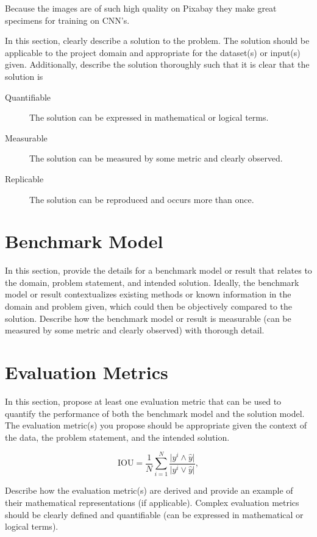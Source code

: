 \documentclass[10pt, a4paper, twocolumn]{article} %
\begin{document}
Because the images are of such high quality on Pixabay they make great specimens for training on CNN's.

In this section, clearly describe a solution to the problem. The solution should be applicable to the project domain and appropriate for the dataset(s) or input(s) given. Additionally, describe the solution thoroughly such that it is clear that the solution is 

\begin{description}
	\item[Quantifiable] The solution can be expressed in mathematical or logical terms.
	\item[Measurable] The solution can be measured by some metric and clearly observed.
	\item[Replicable] The solution can be reproduced and occurs more than once.
\end{description}

\section{Benchmark Model} %

In this section, provide the details for a benchmark model or result that relates to the domain, problem statement, and intended solution. Ideally, the benchmark model or result contextualizes existing methods or known information in the domain and problem given, which could then be objectively compared to the solution. Describe how the benchmark model or result is measurable (can be measured by some metric and clearly observed) with thorough detail.

\section{Evaluation Metrics} %

In this section, propose at least one evaluation metric that can be used to quantify the performance of both the benchmark model and the solution model. The evaluation metric(s) you propose should be appropriate given the context of the data, the problem statement, and the intended solution. 

\begin{equation}
\mathrm{IOU} = \frac{1}{N}\sum_{i=1}^{N}\frac{\vert y^i \wedge \hat{y} \vert}{\vert y^i \vee \hat{y} \vert}, \label{eq:IOU}
\end{equation}

Describe how the evaluation metric(s) are derived and provide an example of their mathematical representations (if applicable). Complex evaluation metrics should be clearly defined and quantifiable (can be expressed in mathematical or logical terms).
\end{document}
